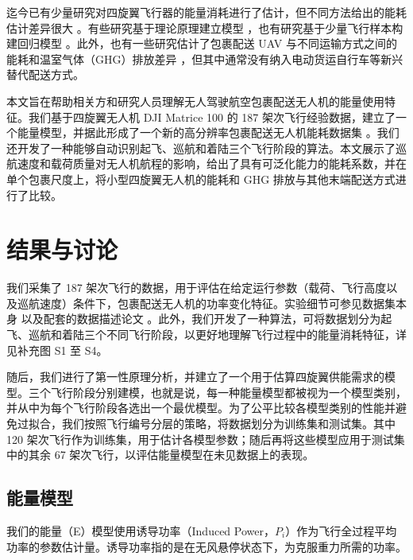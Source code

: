 \documentclass{article}
\begin{document}
迄今已有少量研究对四旋翼飞行器的能量消耗进行了估计，但不同方法给出的能耗估计差异很大 \cite{Zhang2021EnergyAssessment}。有些研究基于理论原理建立模型 \cite{DAndrea2014GuestDeliver, Figliozzi2017LifecycleEmissions, Dorling2016VehicleDelivery, Liu2017, Lohn2018TheBuzz, Stolaroff2018EnergyDelivery, Jeong2019Truck-droneZones,Torabbeigi2019, Kirschstein2020ComparisonServices}，也有研究基于少量飞行样本构建回归模型 \cite{Dorling2016VehicleDelivery, Tseng2017AutonomousDrones, Tseng2017FlightDrones, Jeong2019Truck-droneZones}。此外，也有一些研究估计了包裹配送 UAV 与不同运输方式之间的能耗和温室气体（GHG）排放差异 \cite{Stolaroff2018EnergyDelivery, Figliozzi2020CarbonVehicles, Goodchild2018DeliveryIndustry, Borlaug2021Heavy-dutySystems}，但其中通常没有纳入电动货运自行车等新兴替代配送方式。 


本文旨在帮助相关方和研究人员理解无人驾驶航空包裹配送无人机的能量使用特征。我们基于四旋翼无人机 DJI Matrice 100 的 187 架次飞行经验数据，建立了一个能量模型，并据此形成了一个新的高分辨率包裹配送无人机能耗数据集 \cite{Rodrigues2020a}。我们还开发了一种能够自动识别起飞、巡航和着陆三个飞行阶段的算法。本文展示了巡航速度和载荷质量对无人机航程的影响，给出了具有可泛化能力的能耗系数，并在单个包裹尺度上，将小型四旋翼无人机的能耗和 GHG 排放与其他末端配送方式进行了比较。      


\section{结果与讨论}

我们采集了 187 架次飞行的数据，用于评估在给定运行参数（载荷、飞行高度以及巡航速度）条件下，包裹配送无人机的功率变化特征。实验细节可参见数据集本身 \cite{Rodrigues2020a} 以及配套的数据描述论文 \cite{Rodrigues2021In-flightDelivery}。此外，我们开发了一种算法，可将数据划分为起飞、巡航和着陆三个不同飞行阶段，以更好地理解飞行过程中的能量消耗特征，详见补充图 S1 至 S4。 

随后，我们进行了第一性原理分析，并建立了一个用于估算四旋翼供能需求的模型。三个飞行阶段分别建模，也就是说，每一种能量模型都被视为一个模型类别，并从中为每个飞行阶段各选出一个最优模型。为了公平比较各模型类别的性能并避免过拟合，我们按照飞行编号分层的策略，将数据划分为训练集和测试集。其中 120 架次飞行作为训练集，用于估计各模型参数；随后再将这些模型应用于测试集中的其余 67 架次飞行，以评估能量模型在未见数据上的表现。  

\subsection{能量模型}
我们的能量（E）模型使用诱导功率（Induced Power，$P_{i}$）作为飞行全过程平均功率的参数估计量。诱导功率指的是在无风悬停状态下，为克服重力所需的功率。
\end{document}
